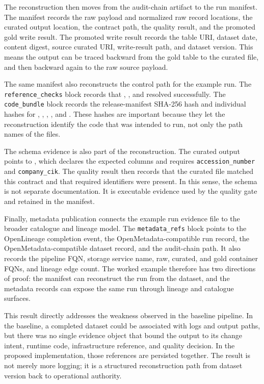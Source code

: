 The reconstruction then moves from the audit-chain artifact to the run
manifest. The manifest records the raw payload and normalized raw record
locations, the curated output location, the contract path, the quality result,
and the promoted gold write result. The promoted write result records the
table URI, dataset date, content digest, source curated URI, write-result path,
and dataset version. This means the output can be traced backward from the
gold table to the curated file, and then backward again to the raw source
payload.

The same manifest also reconstructs the control path for the example run. The
\texttt{reference\_checks} block records that
,
, and
 resolved successfully. The
\texttt{code\_bundle} block records the release-manifest SHA-256 hash and
individual hashes for ,
,
,
, and
. These hashes are important
because they let the reconstruction identify the code that was intended to run,
not only the path names of the files.

The schema evidence is also part of the reconstruction. The curated output
points to , which declares the
expected columns and requires \texttt{accession\_number} and
\texttt{company\_cik}. The quality result then records that the curated file
matched this contract and that required identifiers were present. In this
sense, the schema is not separate documentation. It is executable evidence
used by the quality gate and retained in the manifest.

Finally, metadata publication connects the example run evidence file to the
broader catalogue and lineage model. The \texttt{metadata\_refs} block points to the
OpenLineage completion event, the OpenMetadata-compatible run record, the
OpenMetadata-compatible dataset record, and the audit-chain path. It also
records the pipeline FQN, storage service name, raw, curated, and gold
container FQNs, and lineage edge count. The worked example therefore has two
directions of proof: the manifest can reconstruct the run from the dataset,
and the metadata records can expose the same run through lineage and catalogue
surfaces.

This result directly addresses the weakness observed in the baseline pipeline.
In the baseline, a completed dataset could be associated with logs and output
paths, but there was no single evidence object that bound the output to its
change intent, runtime code, infrastructure reference, and quality decision. In
the proposed implementation, those references are persisted together. The
result is not merely more logging; it is a structured reconstruction path from
dataset version back to operational authority.


